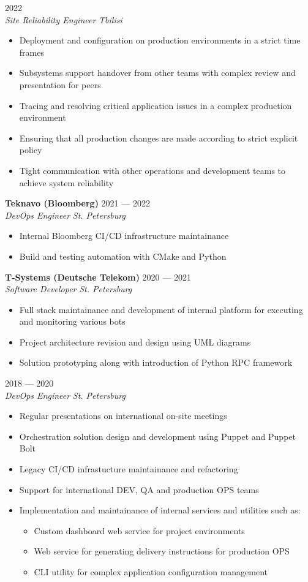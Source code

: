 \documentclass[10pt]{report}
\newenvironment{JobDescription}[5]{
    \vspace{ #5 }
    \flushleft
    {\bf #1 } \hfill { #2 }
    \\
    {\em #3 } \hfill {\em #4 }
    \begin{itemize}
} {
    \end{itemize}
}
\begin{document}
\begin{JobDescription}{}{2022}{Site Reliability Engineer}{Tbilisi}{-3mm}
    \item Deployment and configuration on production environments in a strict time frames
    \item Subsystems support handover from other teams with complex review and
          presentation for peers
    \item Tracing and resolving critical application issues in a complex
          production environment
    \item Ensuring that all production changes are made according to strict
          explicit policy
    \item Tight communication with other operations and development teams
          to achieve system reliability
\end{JobDescription}

\begin{JobDescription}{Teknavo (Bloomberg)}{2021 --- 2022}{DevOps Engineer}{St. Petersburg}{5mm}
    \item Internal Bloomberg CI/CD infrastructure maintainance
    \item Build and testing automation with CMake and Python
\end{JobDescription}

\goodbreak

\begin{JobDescription}{T-Systems (Deutsche Telekom)}{2020 --- 2021}{Software Developer}{St. Petersburg}{0mm}
    \item Full stack maintainance and development of internal platform for executing and monitoring various bots
    \item Project architecture revision and design using UML diagrams
    \item Solution prototyping along with introduction of Python RPC framework
\end{JobDescription}

\begin{JobDescription}{}{2018 --- 2020}{DevOps Engineer}{St. Petersburg}{-3mm}
    \item Regular presentations on international on-site meetings
    \item Orchestration solution design and development using Puppet and Puppet Bolt
    \item Legacy CI/CD infrastucture maintainance and refactoring
    \item Support for international DEV, QA and production OPS teams
    \item Implementation and maintainance of internal services and utilities such as:
    \begin{itemize}
        \item Custom dashboard web service for project environments
        \item Web service for generating delivery instructions for production OPS
        \item CLI utility for complex application configuration management
    \end{itemize}
\end{JobDescription}
\end{document}
